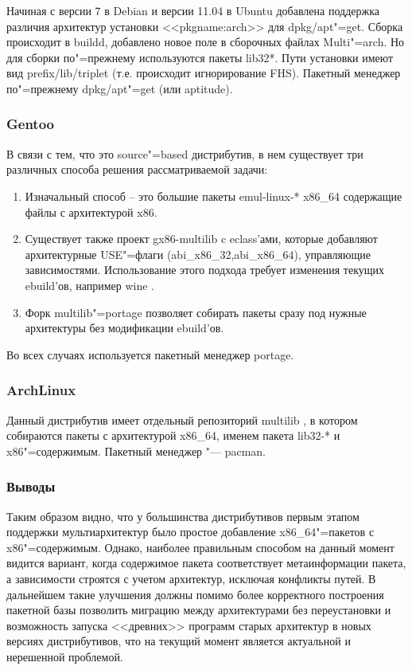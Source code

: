 \documentclass[10pt, a5paper]{article}
\begin{document}
Начиная с версии 7 в Debian и версии 11.04 в Ubuntu добавлена поддержка различия архитектур установки <<pkgname:arch>> для dpkg/apt"=get. Сборка происходит в buildd, добавлено новое поле в сборочных файлах Multi"=arch. Но для сборки по"=прежнему используются  пакеты lib32*. Пути установки имеют вид prefix/lib/triplet (т.е. происходит игнорирование FHS). Пакетный менеджер по"=прежнему dpkg/apt"=get (или aptitude).

\subsubsection*{Gentoo}

В связи с тем, что это source"=based дистрибутив, в нем существует три различных способа решения рассматриваемой задачи\cite{Sha9}:

\begin{enumerate}
  \item Изначальный способ -- это большие пакеты emul-linux-* \linebreak x86\_64 \cite{Sha10} содержащие файлы с архитектурой x86.
  \item Существует также проект gx86-multilib \cite{Sha11}c eclass'ами, которые добавляют архитектурные USE"=флаги (abi\_x86\_32,\linebreak abi\_x86\_64), управляющие зависимостями. Использование \linebreak этого подхода требует изменения текущих ebuild'ов, например wine \cite{Sha12}.
  \item Форк multilib"=portage позволяет собирать пакеты сразу под нужные архитектуры без модификации ebuild'ов.
\end{enumerate}

Во всех случаях используется пакетный менеджер portage.

\subsubsection*{ArchLinux}

Данный дистрибутив имеет отдельный репозиторий multilib \cite{Sha13}, в котором собираются пакеты с архитектурой x86\_64, именем пакета lib32-* и x86"=содержимым. Пакетный менеджер "--- pacman.

\subsubsection*{Выводы}

Таким образом видно, что у большинства дистрибутивов первым этапом поддержки мультиархитектур было простое добавление x86\_64"=пакетов с x86"=содержимым. Однако, наиболее правильным способом на данный момент видится вариант, когда содержимое пакета соответствует метаинформации пакета, а зависимости строятся с учетом архитектур, исключая конфликты путей. В дальнейшем такие улучшения должны помимо более корректного построения пакетной базы позволить миграцию между архитектурами без переустановки и возможность запуска <<древних>> программ старых архитектур в новых версиях дистрибутивов, что на текущий момент является актуальной и нерешенной проблемой.
\end{document}
